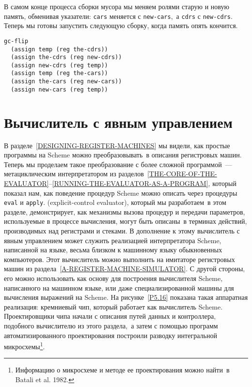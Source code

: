 В самом конце процесса сборки мусора мы меняем ролями старую и
новую память, обменивая указатели: {\tt cars} меняется с
{\tt new-cars},~а {\tt cdrs} с {\tt new-cdrs}.
Теперь мы готовы запустить следующую сборку, когда память опять
кончится.

\begin{Verbatim}[fontsize=\small]
gc-flip
  (assign temp (reg the-cdrs))
  (assign the-cdrs (reg new-cdrs))
  (assign new-cdrs (reg temp))
  (assign temp (reg the-cars))
  (assign the-cars (reg new-cars))
  (assign new-cars (reg temp))
\end{Verbatim}

\section{Вычислитель с явным управлением}
\label{THE-EXPLICIT-CONTROL-EVALUATOR}


В разделе~\ref{DESIGNING-REGISTER-MACHINES} мы
видели, как простые программы на Scheme можно преобразовывать~в описания
регистровых машин.  Теперь мы проделаем такое преобразование с более
сложной программой~--- метациклическим интерпретатором из 
разделов~\ref{THE-CORE-OF-THE-EVALUATOR}--\ref{RUNNING-THE-EVALUATOR-AS-A-PROGRAM},
который показал нам, как поведение процедур Scheme можно описать через
процедуры {\tt eval} и {\tt apply}.
 (explicit-control evaluator), который мы разработаем~в этом разделе, демонстрирует,
как механизмы вызова процедур и передачи параметров, используемые в
процессе вычисления, могут быть описаны~в терминах действий,
производимых над регистрами и стеками.  В дополнение к этому
вычислитель с явным управлением может служить реализацией
интерпретатора Scheme, написанной на языке, весьма близком к машинному
языку обыкновенных компьютеров.  Этот вычислитель можно выполнить на
имитаторе регистровых машин из 
раздела~\ref{A-REGISTER-MACHINE-SIMULATOR}.  С другой стороны, его
можно использовать как основу для построения вычислителя Scheme,
написанного на машинном языке, 
или даже специализированной машины для
вычисления выражений на Scheme.  На рисунке~\ref{P5.16}
показана такая аппаратная реализация: кремниевый чип, который работает
как вычислитель Scheme.  Проектировщики чипа начали с описания путей
данных и контроллера, подобного вычислителю из этого раздела,~а затем с
помощью программ автоматизированного проектирования построили разводку
интегральной микросхемы\footnote{Информацию о микросхеме и методе ее проектирования можно
найти~в Batali et al. 1982.
}.


